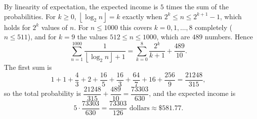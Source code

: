 By linearity of expectation, the expected income is $5$ times the sum of the probabilities. For $k\ge0$, $\left\lfloor\log_2n\right\rfloor=k$ exactly when $2^k\le n\le2^{k+1}-1$, which holds for $2^k$ values of $n$. For $n\le1000$ this covers $k=0,1,\dots,8$ completely ($n\le511$), and for $k=9$ the values $512\le n\le1000$, which are $489$ numbers. Hence
\[\sum_{n=1}^{1000}\dfrac{1}{\left\lfloor\log_2n\right\rfloor+1}=\sum_{k=0}^{8}\dfrac{2^k}{k+1}+\dfrac{489}{10}.\]
The first sum is
\[1+1+\dfrac43+2+\dfrac{16}{5}+\dfrac{16}{3}+\dfrac{64}{7}+16+\dfrac{256}{9}=\dfrac{21248}{315},\]
so the total probability is $\dfrac{21248}{315}+\dfrac{489}{10}=\dfrac{73303}{630}$, and the expected income is
\[5\cdot\dfrac{73303}{630}=\boxed{\dfrac{73303}{126}\text{ dollars}}\approx\$581.77.\]
